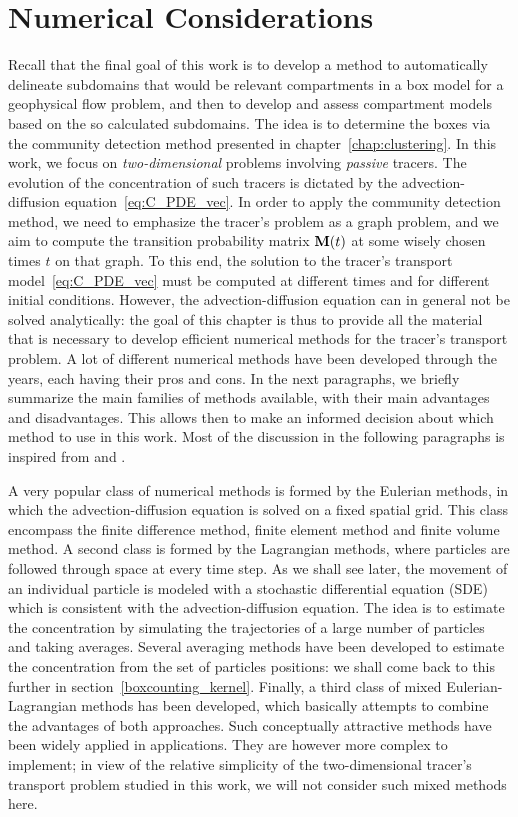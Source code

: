 \chapter{Numerical Considerations} \label{chap:numerical}
Recall that the final goal of this work is to develop a method to automatically delineate subdomains that would be relevant compartments in a box model for a geophysical flow problem, and then to develop and assess compartment models based on the so calculated subdomains. The idea is to determine the boxes via the community detection method presented in chapter~\ref{chap:clustering}. In this work, we focus on \textit{two-dimensional} problems involving \textit{passive} tracers. The evolution of the concentration of such tracers is dictated by the advection-diffusion equation~\eqref{eq:C_PDE_vec}. In order to apply the community detection method, we need to emphasize the tracer's problem as a graph problem, and we aim to compute the transition probability matrix $\mathbf M(t)$ at some wisely chosen times $t$ on that graph. To this end, the solution to the tracer's transport model~\eqref{eq:C_PDE_vec} must be computed at different times and for different initial conditions. However, the advection-diffusion equation can in general not be solved analytically: the goal of this chapter is thus to provide all the material that is necessary to develop efficient numerical methods for the tracer's transport problem. A lot of different numerical methods have been developed through the years, each having their pros and cons. In the next paragraphs, we briefly summarize the main families of methods available, with their main advantages and disadvantages. This allows then to make an informed decision about which method to use in this work. Most of the discussion in the following paragraphs is inspired from \cite{spivakovskaya2007lagrangian} and \cite{spivakovskaya2007backward}. 

A very popular class of numerical methods is formed by the Eulerian methods, in which the advection-diffusion equation is solved on a fixed spatial grid. This class encompass the finite difference method, finite element method and finite volume method. A second class is formed by the Lagrangian methods, where particles are followed through space at every time step. As we shall see later, the movement of an individual particle is modeled with a stochastic differential equation (SDE) which is consistent with the advection-diffusion equation. The idea is to estimate the concentration by simulating the trajectories of a large number of particles and taking averages. Several averaging methods have been developed to estimate the concentration from the set of particles positions: we shall come back to this further in section~\ref{boxcounting_kernel}. Finally, a third class of mixed Eulerian-Lagrangian methods has been developed, which basically attempts to combine the advantages of both approaches. Such conceptually attractive methods have been widely applied in applications. They are however more complex to implement; in view of the relative simplicity of the two-dimensional tracer's transport problem studied in this work, we will not consider such mixed methods here.

